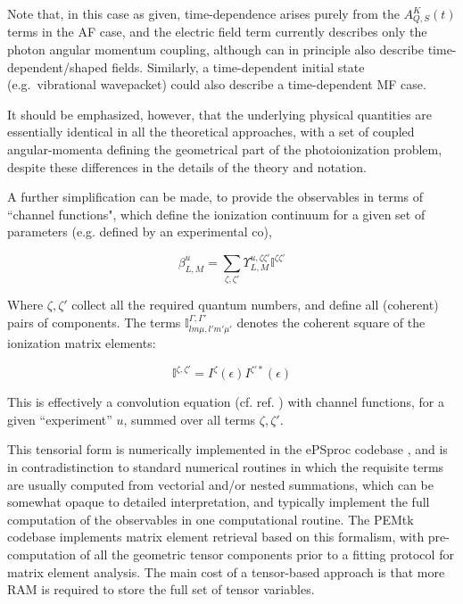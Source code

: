 Note that, in this case as given, time-dependence arises purely from the \(A_{Q,S}^{K}(t)\) terms in the AF case, and the electric field term currently describes only the photon angular momentum coupling,
although can in principle also describe time-dependent/shaped fields. Similarly, a time-dependent initial state (e.g.~vibrational wavepacket) could also describe a time-dependent MF case.

It should be emphasized, however, that the underlying physical quantities are essentially identical in all the theoretical approaches, with a set of coupled angular-momenta defining the geometrical part of the photoionization problem, despite these differences in the details of the theory and notation. 

A further simplification can be made, to provide the observables in terms of ``channel functions", which define the ionization continuum for a given set of parameters (e.g. defined by an experimental co),

\begin{equation}
\beta_{L,M}^{u}=\sum_{\zeta,\zeta'}\varUpsilon_{L,M}^{u,\zeta\zeta'}\mathbb{I}^{\zeta\zeta'}
\end{equation}


Where $\zeta,\zeta'$ collect all the required quantum numbers, and define all (coherent) pairs of components. The terms $\mathbb{I}_{lm\mu,l'm'\mu'}^{\Gamma,\Gamma'}$ denotes the coherent square of the ionization matrix elements:

\begin{equation}
\mathbb{I}^{\zeta,\zeta'}=I^{\zeta}(\epsilon)I^{\zeta'*}(\epsilon)
\end{equation}

This is effectively a convolution equation (cf. ref. \cite{Reid2000}) with channel functions, for
a given ``experiment'' $u$, summed over all terms $\zeta,\zeta'$.

This tensorial form is numerically implemented in the ePSproc codebase \cite{ePSprocGithub}, and is in contradistinction to standard numerical routines in which the requisite terms are usually computed from vectorial and/or nested summations, which can be somewhat opaque to detailed interpretation, and typically implement the full computation of the observables in one computational routine. The PEMtk codebase \cite{hockett2021PhotoelectronMetrologyToolkit} implements matrix element retrieval based on this formalism, with pre-computation of all the geometric tensor components prior to a fitting protocol for matrix element analysis. The main cost of a tensor-based approach is that more RAM is required to store the full set of tensor variables.

